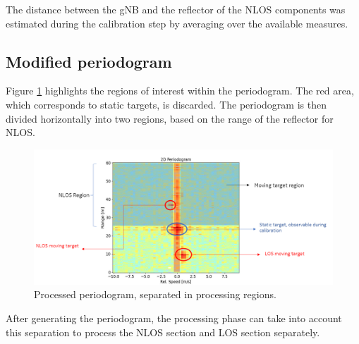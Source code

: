 	The distance between the gNB and the reflector of the NLOS components was estimated during the calibration step by averaging over the available measures.
	
	\subsection{Modified periodogram}
	
	Figure \ref{fig:Rad_nlos_los_separation} highlights the regions of interest within the periodogram.
	The red area, which corresponds to static targets, is discarded. The periodogram is then divided horizontally into two regions, based on the range of the reflector for NLOS.
	
	\begin{figure}[H]
		\centering
		\includegraphics[width=1.1\textwidth]{Images/Test1/nlos-los-separation.png}
		\caption{Processed periodogram, separated in processing regions.}
		\label{fig:Rad_nlos_los_separation}
	\end{figure}
	
	
	After generating the periodogram, the processing phase can take into account this separation to process the NLOS section and LOS section separately.
	







